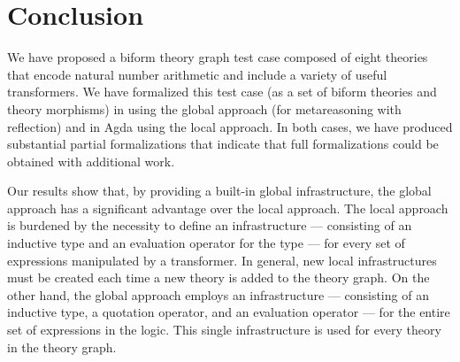 \documentclass[fleqn]{llncs}
\begin{document}
\section{Conclusion}\label{sec:conclusion}

\iffalse
\begin{verbatim}
Outline:

  1. Both CTT_uqe and Agda can be used to formalize the biform theories
     involved in the network in Fig.1.

  2. CTT_uqe provides a built-in infrastructure for reasoning about
     syntax, but it is a nonstandard language with an unfamiliar
     semantics that has not been implemented.

  3. Agda is implemented, but by using the local approach,
     (1) the size of its infrastructure for
     reasoning about syntax depends on the size of the biform theory
     graph that is formalized and (2) it does not have an implemented
     notion of theory morphism (Is this true?).  This is not inherently
     a fault of Agda's.

  4. Recommendation: CTT_uqe is implemented, and then the test study
     is fully formalized in this implementation.

  5. Recommendation: implementing the global approach using Agda's
     reflection mechanism, to see how that compares to the global
     approach in CTT_uqe.

  6. To better understand the local approach, some automation to 
     derive languages related to each theory should be implemented.
\end{verbatim}
\fi

We have proposed a biform theory graph test case composed of eight
theories that encode natural number arithmetic and include a variety
of useful transformers.  We have formalized this test case (as a set
of biform theories and theory morphisms) in {\churchuqe} using the
global approach (for metareasoning with reflection) and in Agda using
the local approach.  In both cases, we have produced substantial
partial formalizations that indicate that full formalizations could be
obtained with additional work.

Our results show that, by providing a built-in global infrastructure,
the global approach has a significant advantage over the local
approach.  The local approach is burdened by the necessity to define
an infrastructure --- consisting of an inductive type and an
evaluation operator for the type --- for every set of expressions
manipulated by a transformer.  In general, new local infrastructures
must be created each time a new theory is added to the theory graph.
On the other hand, the global approach employs an infrastructure ---
consisting of an inductive type, a quotation operator, and an
evaluation operator --- for the entire set of expressions in the
logic.  This single infrastructure is used for every theory in the
theory graph.
\end{document}
